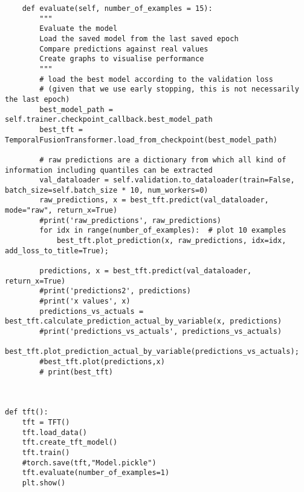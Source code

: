 \documentclass{article}
\begin{document}
\begin{lstlisting}
    def evaluate(self, number_of_examples = 15):
        """
        Evaluate the model
        Load the saved model from the last saved epoch
        Compare predictions against real values
        Create graphs to visualise performance
        """
        # load the best model according to the validation loss
        # (given that we use early stopping, this is not necessarily the last epoch)
        best_model_path = self.trainer.checkpoint_callback.best_model_path
        best_tft = TemporalFusionTransformer.load_from_checkpoint(best_model_path)

        # raw predictions are a dictionary from which all kind of information including quantiles can be extracted
        val_dataloader = self.validation.to_dataloader(train=False, batch_size=self.batch_size * 10, num_workers=0)
        raw_predictions, x = best_tft.predict(val_dataloader, mode="raw", return_x=True)
        #print('raw_predictions', raw_predictions)
        for idx in range(number_of_examples):  # plot 10 examples
            best_tft.plot_prediction(x, raw_predictions, idx=idx, add_loss_to_title=True);

        predictions, x = best_tft.predict(val_dataloader, return_x=True)
        #print('predictions2', predictions)
        #print('x values', x)
        predictions_vs_actuals = best_tft.calculate_prediction_actual_by_variable(x, predictions)
        #print('predictions_vs_actuals', predictions_vs_actuals)
        best_tft.plot_prediction_actual_by_variable(predictions_vs_actuals);
        #best_tft.plot(predictions,x)
        # print(best_tft)



def tft():
    tft = TFT()
    tft.load_data()
    tft.create_tft_model()
    tft.train()
    #torch.save(tft,"Model.pickle")
    tft.evaluate(number_of_examples=1)
    plt.show()









\end{lstlisting}

\clearpage
\end{document}
